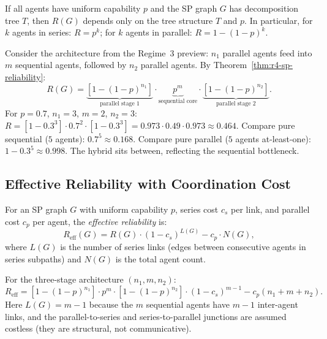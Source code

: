 \begin{corollary}
\label{cor:r4-uniform-sp}
If all agents have uniform capability $p$ and the SP graph $G$ has decomposition
tree $T$, then $R(G)$ depends only on the tree structure $T$ and $p$.
In particular, for $k$ agents in series: $R = p^k$; for $k$ agents in parallel:
$R = 1 - (1-p)^k$.
\end{corollary}

\begin{example}
\label{ex:r4-three-stage}
Consider the architecture from the Regime~3 preview: $n_1$ parallel agents feed into
$m$ sequential agents, followed by $n_2$ parallel agents.  By
Theorem~\ref{thm:r4-sp-reliability}:
\[
  R(G) = \underbrace{[1-(1-p)^{n_1}]}_{\text{parallel stage 1}}
  \cdot \underbrace{p^m}_{\text{sequential core}}
  \cdot \underbrace{[1-(1-p)^{n_2}]}_{\text{parallel stage 2}}.
\]
For $p = 0.7$, $n_1 = 3$, $m = 2$, $n_2 = 3$:
$R = [1 - 0.3^3] \cdot 0.7^2 \cdot [1 - 0.3^3]
= 0.973 \cdot 0.49 \cdot 0.973 \approx 0.464$.
Compare pure sequential ($5$ agents): $0.7^5 \approx 0.168$.
Compare pure parallel ($5$ agents at-least-one): $1 - 0.3^5 \approx 0.998$.
The hybrid sits between, reflecting the sequential bottleneck.
\end{example}

\subsection{Effective Reliability with Coordination Cost}

\begin{theorem}
\label{thm:r4-sp-effective}
For an SP graph $G$ with uniform capability $p$, series cost $c_s$ per link, and
parallel cost $c_p$ per agent, the \emph{effective reliability} is:
\[
  R_{\mathrm{eff}}(G) = R(G) \cdot (1 - c_s)^{L(G)} - c_p \cdot N(G),
\]
where $L(G)$ is the number of series links (edges between consecutive agents in
series subpaths) and $N(G)$ is the total agent count.

For the three-stage architecture $(n_1, m, n_2)$:
\[
  R_{\mathrm{eff}} = [1-(1-p)^{n_1}] \cdot p^m \cdot [1-(1-p)^{n_2}]
  \cdot (1-c_s)^{m-1} - c_p(n_1 + m + n_2).
\]
Here $L(G) = m - 1$ because the $m$ sequential agents have $m-1$ inter-agent
links, and the parallel-to-series and series-to-parallel junctions are assumed
costless (they are structural, not communicative).
\end{theorem}

